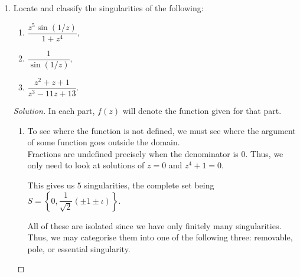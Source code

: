 \documentclass[12pt]{article}
\theoremstyle{definition}
\newenvironment{soln}{\begin{proof}[Solution]}{\end{proof}}
\begin{document}
\begin{enumerate}[leftmargin=*]
\begin{soln}
		Use binomial expansion, we see that
		\begin{align*} 
			(z^2 + 1)^{2n} &= \sum_{k=0}^{2n}\dbinom{2n}{k}(z^2)^{k}.
		\end{align*}
		Thus, the desired coefficient is $\dbinom{2n}{n}$ and the integral is
		\begin{equation*} 
			\int_{|z| = 1}^{} \left(z + \dfrac{1}{z}\right)^{2n}\dfrac{1}{z} {\mathrm{d}}z = 2\pi\iota\dbinom{2n}{n}.
		\end{equation*}

		Now, we may compute the integral the menial way, i.e., by \emph{parameterising and solving.}

		Using the standard parameterisation of $z(t) = e^{\iota t}$ for $t \in [0, 2\pi],$ the integral becomes

		\begin{align*} 
			\int_{|z| = 1}^{} \left(z + \dfrac{1}{z}\right)^{2n}\dfrac{1}{z} {\mathrm{d}}z &= \int_{0}^{2\pi} (2\cos t)^{2n}\dfrac{1}{e^{\iota t}}(\iota e^{\iota t}) {\mathrm{d}}t\\
			&= 4^n\iota\int_{0}^{2\pi} \cos^{2n}(t) {\mathrm{d}}t.
		\end{align*}

		Equating it with the previous result gives us the desired answer.
	\end{soln}
	\item Locate and classify the singularities of the following:
	\begin{enumerate}
		\item $\dfrac{z^5\sin(1/z)}{1 + z^4},$
		\item $\dfrac{1}{\sin(1/z)},$
		\item $\dfrac{z^2 + z + 1}{z^3 - 11z + 13}.$
	\end{enumerate}
	\begin{soln}
		In each part, $f(z)$ will denote the function given for that part.
		\begin{enumerate}
			\item To see where the function is not defined, we must see where the argument of some function goes outside the domain.\\
			Fractions are undefined precisely when the denominator is $0.$ Thus, we only need to look at solutions of $z = 0$ and $z^4 + 1 = 0.$

			This gives us $5$ singularities, the complete set being $S = \left\{0, \dfrac{1}{\sqrt{2}}(\pm1\pm\iota)\right\}.$

			All of these are isolated since we have only finitely many singularities. Thus, we may categorise them into one of the following three: removable, pole, or essential singularity.


\end{enumerate}
\end{soln}
\end{enumerate}
\end{document}
